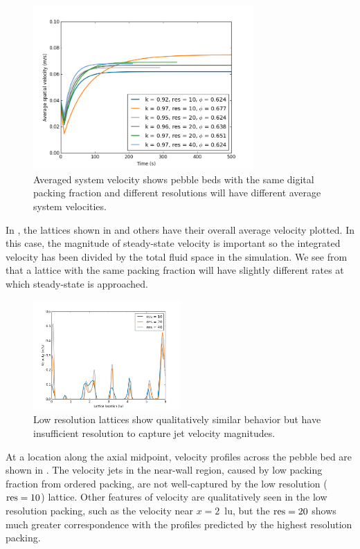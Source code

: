 \begin{figure}[h]
    \centering
    \includegraphics[width=0.75\textwidth]{figures/lbm/3d-lbm-settings-velocity}
    \caption{Averaged system velocity shows pebble beds with the same digital packing fraction and different resolutions will have different average system velocities.}\label{fig:3d-lbm-settings-velocity}
\end{figure}

In , the lattices shown in  and others have their overall average velocity plotted. In this case, the magnitude of steady-state velocity is important so the integrated velocity has been divided by the total fluid space in the simulation. We see from  that a lattice with the same packing fraction will have slightly different rates at which steady-state is approached. 

\begin{figure}[h]
    \centering
    \includegraphics[width=0.5\textwidth]{figures/lbm/3d-bed-v-profiles}
    \caption{Low resolution lattices show qualitatively similar behavior but have insufficient resolution to capture jet velocity magnitudes.}\label{fig:3d-bed-v-profiles}
\end{figure}

At a location along the axial midpoint, velocity profiles across the pebble bed are shown in . The velocity jets in the near-wall region, caused by low packing fraction from ordered packing, are not well-captured by the low resolution ($\text{res} = 10$) lattice. Other features of velocity are qualitatively seen in the low resolution packing, such as the velocity near $x = 2$~lu, but the $\text{res}=20$ shows much greater correspondence with the profiles predicted by the highest resolution packing.


